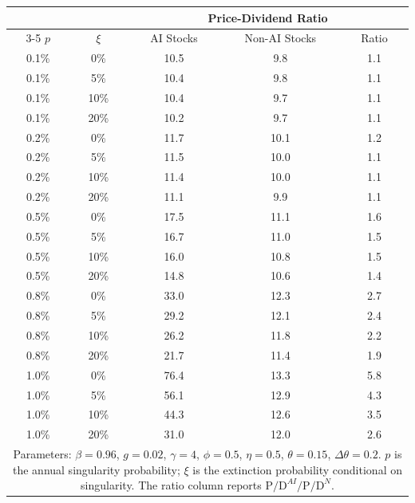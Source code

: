\begin{tabular}{cc ccc}
\toprule
 & & \multicolumn{3}{c}{Price-Dividend Ratio} \\
\cmidrule(lr){3-5}
$p$ & $\xi$ & AI Stocks & Non-AI Stocks & Ratio \\
\midrule
0.1\% & 0\% & 10.5 & 9.8 & 1.1 \\
0.1\% & 5\% & 10.4 & 9.8 & 1.1 \\
0.1\% & 10\% & 10.4 & 9.7 & 1.1 \\
0.1\% & 20\% & 10.2 & 9.7 & 1.1 \\
\midrule
0.2\% & 0\% & 11.7 & 10.1 & 1.2 \\
0.2\% & 5\% & 11.5 & 10.0 & 1.1 \\
0.2\% & 10\% & 11.4 & 10.0 & 1.1 \\
0.2\% & 20\% & 11.1 & 9.9 & 1.1 \\
\midrule
0.5\% & 0\% & 17.5 & 11.1 & 1.6 \\
0.5\% & 5\% & 16.7 & 11.0 & 1.5 \\
0.5\% & 10\% & 16.0 & 10.8 & 1.5 \\
0.5\% & 20\% & 14.8 & 10.6 & 1.4 \\
\midrule
0.8\% & 0\% & 33.0 & 12.3 & 2.7 \\
0.8\% & 5\% & 29.2 & 12.1 & 2.4 \\
0.8\% & 10\% & 26.2 & 11.8 & 2.2 \\
0.8\% & 20\% & 21.7 & 11.4 & 1.9 \\
\midrule
1.0\% & 0\% & 76.4 & 13.3 & 5.8 \\
1.0\% & 5\% & 56.1 & 12.9 & 4.3 \\
1.0\% & 10\% & 44.3 & 12.6 & 3.5 \\
1.0\% & 20\% & 31.0 & 12.0 & 2.6 \\
\bottomrule
\multicolumn{5}{p{0.85\textwidth}}{\footnotesize Parameters: $\beta=0.96$, $g=0.02$, $\gamma=4$, $\phi=0.5$, $\eta=0.5$, $\theta=0.15$, $\Delta\theta=0.2$. $p$ is the annual singularity probability; $\xi$ is the extinction probability conditional on singularity. The ratio column reports $\text{P/D}^{AI} / \text{P/D}^{N}$.} \\
\end{tabular}
